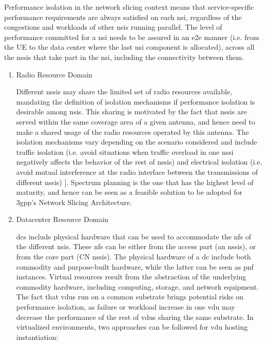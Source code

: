     Performance isolation in the network slicing context means that service-specific performance requirements are always satisfied on each \acrshort{nsi}, regardless of the congestions and workloads of other \acrshort{nsi}s running parallel. The level of performance committed for a \acrshort{nsi} needs to be assured in an \acrshort{e2e} manner (i.e. from the UE to the data center where the last \acrshort{nsi} component is allocated), across all the \acrshort{nssi}s that take part in the \acrshort{nsi}, including the connectivity between them. 
    \begin{enumerate}
        \item{Radio Resource Domain}
        
        Different \acrshort{nssi}s may share the limited set of radio resources available, mandating the definition of isolation mechanisms if performance isolation is desirable among \acrshort{nsi}s. This sharing is motivated by the fact that \acrshort{nssi}s are served within the same coverage area of a given antenna, and hence need to make a shared usage of the radio resources operated by this antenna. The isolation mechanisms vary depending on the scenario considered and include traffic isolation (i.e. avoid situations when traffic overload in one \acrshort{nssi} negatively affects the behavior of the rest of \acrshort{nssi}s) and electrical isolation (i.e. avoid mutual interference at the radio interface between the transmissions of different \acrshort{nssi}s) \cite{7891795}].
        Spectrum planning is the one that has the highest level of maturity, and hence can be seen as a feasible solution to be adopted for \acrshort{3gpp}'s Network Slicing Architecture.

\newpage

        \item{Datacenter Resource Domain} 
        
        \acrshort{dc}s include physical hardware that can be used to accommodate the \acrshort{nf}s of the different \acrshort{nsi}s. These \acrshort{nf}s can be either from the access part (\acrshort{an} \acrshort{nssi}s), or from the core part (CN \acrshort{nssi}s). The physical hardware of a \acrshort{dc} include both commodity and purpose-built hardware, while the latter can be seen as \acrshort{pnf} instances. Virtual resources result from the abstraction of the underlying commodity hardware, including computing, storage, and network equipment. The fact that \acrshort{vdu}s run on a common substrate brings potential risks on performance isolation, as failure or workload increase in one \acrshort{vdu} may decrease the performance of the rest of \acrshort{vdu}s sharing the same substrate. In virtualized environments, two approaches can be followed for \acrshort{vdu} hosting instantiation: 
        

\end{enumerate}
